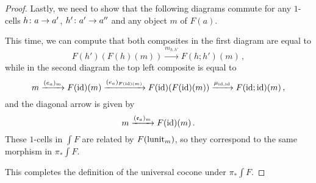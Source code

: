 \documentclass{article}
\begin{document}
\begin{proof}
  Lastly, we need to show that the following diagrams commute for any $1$-cells $h\colon a \to a'$, $h'\colon a' \to a''$ and any object $m$ of $F(a)$.
  This time, we can compute that both composites in the first diagram are equal to
  \[
    F(h')(F(h)(m)) \xrightarrow{m_{h,h'}} F(h;h')(m)\,,
    \]
  while in the second diagram the top left composite is equal to
  \[
    m \xrightarrow{(e_a)_m}
    F(\operatorname{id})(m) \xrightarrow{(e_a)_{F(\operatorname{id})(m)}}
    F(\operatorname{id})(F(\operatorname{id})(m)) \xrightarrow{\mu_{\operatorname{id},\operatorname{id}}}
    F(\operatorname{id};\operatorname{id})(m)\,,
    \]
  and the diagonal arrow is given by
  \[
    m \xrightarrow{(\mathfrak e_a)_m}
    F(\operatorname{id})(m)\,.
    \]
  These $1$-cells in $\int F$ are related by $F(\operatorname{lunit}_m)$, so they correspond to the same morphism in $\pi_*\int F$.

  This completes the definition of the universal cocone under $\pi_*\int F$.


\end{proof}
\end{document}
